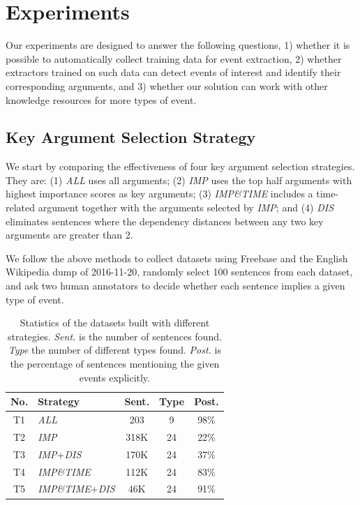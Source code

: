 \section{Experiments}
Our experiments are designed to answer the following questions,
1) whether it is possible to automatically collect training data for event extraction,
2) whether  extractors trained on such data can detect events of interest and identify
their corresponding arguments,
and 3) whether our solution can work with other knowledge resources for more types of event.

 \subsection{Key Argument Selection Strategy}\label{sec:evalhypo}
We start by comparing the effectiveness of four key argument selection strategies. They are: (1) \emph{ALL} uses all arguments; (2)
\emph{IMP} uses the top half arguments with highest importance scores as key arguments; (3) \emph{IMP\&TIME} includes a time-related
argument together with  the arguments selected by \emph{IMP}; and (4) \emph{DIS} eliminates sentences where the dependency distances
between any two key arguments are greater than 2.

We follow the above methods to collect datasets using Freebase and the English Wikipedia dump of 2016-11-20, randomly select 100 sentences
from each dataset, and ask two human annotators to decide whether each sentence implies a given type of event.




\begin{table}[t!]
\small
\centering
\begin{tabular}{clccc}
    \toprule
	No. & Strategy & Sent. & Type & Post. \\
    \midrule
	T1 & \emph{ALL} & 203 & 9 & 98\% \\
	T2 & \emph{IMP} & 318K & 24 & 22\% \\
	T3 & \emph{IMP}+\emph{DIS} & 170K & 24 & 37\%   \\
	T4 & \emph{IMP\&TIME} & 112K & 24 & 83\% \\
	T5 & \emph{IMP\&TIME}+\emph{DIS} & 46K & 24 & 91\% \\
    \bottomrule
\end{tabular}
\caption{Statistics of the datasets built with different strategies.
\textit{Sent.} is the number of sentences found. \textit{Type} the number of different \CVT types found.  \textit{Post.} is the percentage of sentences mentioning the given events explicitly.\label{tab:3}}
\end{table}

